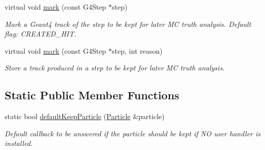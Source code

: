 \begin{DoxyCompactItemize}
virtual void \hyperlink{class_d_d4hep_1_1_simulation_1_1_geant4_particle_handler_aa03024ccc930c57fcfcd515605072f4b}{mark} (const G4Step $\ast$step)
\begin{DoxyCompactList}\small\item\em Mark a Geant4 track of the step to be kept for later MC truth analysis. Default flag: CREATED\_\-HIT. \item\end{DoxyCompactList}\item 
virtual void \hyperlink{class_d_d4hep_1_1_simulation_1_1_geant4_particle_handler_a7a351cfb66cc4e50b9f184b2e80855f4}{mark} (const G4Step $\ast$step, int reason)
\begin{DoxyCompactList}\small\item\em Store a track produced in a step to be kept for later MC truth analysis. \item\end{DoxyCompactList}\end{DoxyCompactItemize}
\subsection*{Static Public Member Functions}
\begin{DoxyCompactItemize}
\item 
static bool \hyperlink{class_d_d4hep_1_1_simulation_1_1_geant4_particle_handler_a1d0fdcaf979ddb882519706a3963f54f}{defaultKeepParticle} (\hyperlink{class_d_d4hep_1_1_simulation_1_1_geant4_particle}{Particle} \&particle)
\begin{DoxyCompactList}\small\item\em Default callback to be answered if the particle should be kept if NO user handler is installed. \item\end{DoxyCompactList}\end{DoxyCompactItemize}
